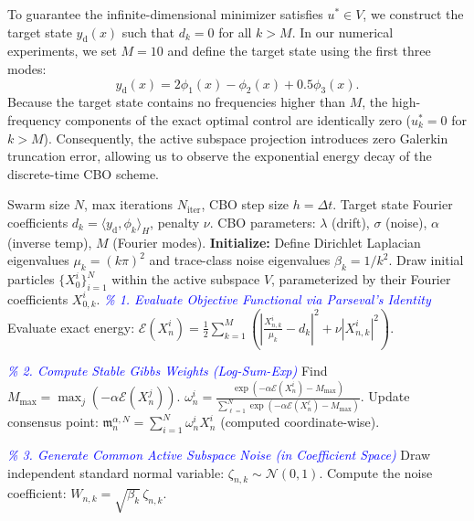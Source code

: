 \documentclass[12pt]{amsart}
\numberwithin{equation}{section}
\begin{document}
To guarantee the infinite-dimensional minimizer satisfies $u^* \in V$, we construct the target state $y_{\text{d}}(x)$ such that $d_k = 0$ for all $k > M$. In our numerical experiments, we set $M=10$ and define the target state  using the first three modes: 
\[
y_{\text{d}}(x) = 2\phi_1(x) - \phi_2(x) + 0.5\phi_3(x).
\]
Because the target state contains no frequencies higher than $M$, the high-frequency components of the exact optimal control are identically zero ($u_k^* = 0$ for $k > M$). Consequently, the active subspace projection introduces zero Galerkin truncation error, allowing us to observe the exponential energy decay of the discrete-time CBO scheme.

\begin{algorithm}[h]
\caption{Spectral Discrete-Time CBO for Inverse Source PDE Problem}
\label{alg:cbo_pde}
\begin{algorithmic}[1]
\renewcommand{\algorithmicrequire}{\textbf{Input:}}
\renewcommand{\algorithmicensure}{\textbf{Output:}}
\REQUIRE Swarm size $N$, max iterations $N_{\text{iter}}$, CBO step size $h = \Delta t$.
\REQUIRE Target state Fourier coefficients $d_k = \langle y_{\text{d}}, \phi_k \rangle_H$, penalty $\nu$.
\REQUIRE CBO parameters: $\lambda$ (drift), $\sigma$ (noise), $\alpha$ (inverse temp), $M$ (Fourier modes).
\STATE \textbf{Initialize:} 
\STATE Define Dirichlet Laplacian eigenvalues $\mu_k = (k\pi)^2$ and trace-class noise eigenvalues $\beta_k = 1/k^2$.
\STATE Draw initial particles $\{X_0^i\}_{i=1}^N$ within the active subspace $V$, parameterized by their Fourier coefficients $X_{0,k}^i$.
    \STATE \textcolor{blue}{\textit{\% 1. Evaluate Objective Functional via Parseval's Identity}}
        \STATE Evaluate exact energy: $\mathscr{E}(X_n^i) = \frac{1}{2} \sum_{k=1}^M \left( \left| \frac{X_{n,k}^i}{\mu_k} - d_k \right|^2 + \nu |X_{n,k}^i|^2 \right)$.
    \ENDFOR
    
    \STATE \textcolor{blue}{\textit{\% 2. Compute Stable Gibbs Weights (Log-Sum-Exp)}}
    \STATE Find $M_{\max} = \max_{j} (-\alpha \mathscr{E}(X_n^j))$.
        \STATE $\omega_n^i = \frac{\exp(-\alpha \mathscr{E}(X_n^i) - M_{\max})}{\sum_{\ell=1}^N \exp(-\alpha \mathscr{E}(X_n^\ell) - M_{\max})}$.
    \ENDFOR
    \STATE Update consensus point: $\mathfrak{m}_n^{\alpha, N} = \sum_{i=1}^N \omega_n^i X_n^i$ (computed coordinate-wise).
    
    \STATE \textcolor{blue}{\textit{\% 3. Generate Common Active Subspace Noise (in Coefficient Space)}}
        \STATE Draw independent standard normal variable: $\zeta_{n,k} \sim \mathcal{N}(0,1)$.
        \STATE Compute the noise coefficient: $W_{n,k} = \sqrt{\beta_k}\, \zeta_{n,k}$.
    \ENDFOR
    

\end{algorithmic}
\end{algorithm}
\end{document}
